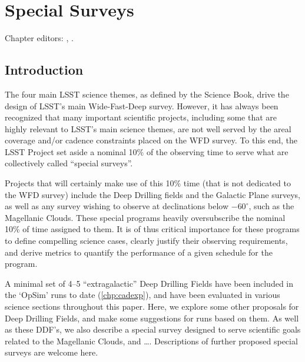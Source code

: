 \chapter[Special Surveys]{Special Surveys}
\def\chpname{specialsurveys}\label{chp:\chpname}

Chapter editors:
,
.




\section{Introduction}
\label{sec:specials:intro}


The four main LSST science themes, as defined by the Science Book,
drive the design of LSST's main Wide-Fast-Deep survey.  However, it
has always been recognized that many important scientific projects,
including some that are highly relevant to LSST's main science themes,
are not well served by the areal coverage and/or cadence constraints
placed on the WFD survey.  To this end, the LSST Project set aside a
nominal 10\% of the observing time to serve what are collectively
called ``special surveys''.

Projects that
will certainly make use of this 10\% time (that is not dedicated to the WFD
survey) include the Deep Drilling fields and the Galactic Plane surveys, as well as any survey wishing to
observe at declinations below $-60^\circ$, such as the Magellanic
Clouds.  These special programs heavily oversubscribe the nominal 10\%
of time assigned to them.  It is of thus critical importance for these
programs to define compelling science cases, clearly justify their
observing requirements, and derive metrics to quantify the performance
of a given schedule for the program.

A minimal set of 4--5 ``extragalactic'' Deep Drilling Fields have been
included in the `OpSim' runs to date (\autoref{chp:cadexp}), and have
been evaluated in various science sections throughout this paper.
Here, we explore some other proposals for Deep Drilling Fields, and
make some suggestions for \OpSim runs based on them. As well as these
DDF's, we also describe a special survey designed to serve scientific
goals related to the Magellanic Clouds, and \ldots.  Descriptions of
further proposed special surveys are welcome here.

